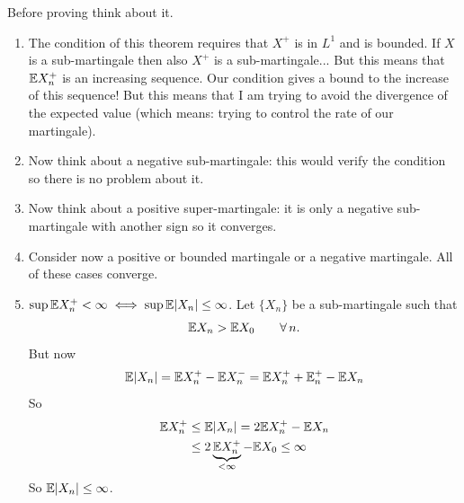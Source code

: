 \documentclass{report}
\begin{document}
Before proving think about it. \begin{enumerate}
\item	The condition of this theorem requires that $X^{+}$ is in $L^{1}$ and is bounded. If $X$ is a sub-martingale then also $X^{+}$ is a sub-martingale... But this means that $\mathbb{E} X^{+}_{n}$ is an increasing sequence. Our condition gives a bound to the increase of this sequence! But this means that I am trying to avoid the divergence of the expected value (which means: trying to control the rate of our martingale). 
\item Now think about a negative sub-martingale: this would verify the condition so there is no problem about it.
\item Now think about a positive super-martingale: it is only a negative sub-martingale with another sign so it converges.
\item Consider now a positive or bounded martingale or a negative martingale. All of these cases converge. 
\item $\sup\mathbb{E} X_{n}^{+}<\infty\iff\sup\mathbb{E}|X_{n}|\leq\infty$. Let $\{X_{n}\}$ be a sub-martingale such that
\begin{equation*}
	\mathbb{E} X_{n}>\mathbb{E} X_{0}\qquad\forall\, n.
\end{equation*}
But now \begin{equation*}
	\mathbb{E}|X_{n}|=\mathbb{E} X_{n}^{+}-\mathbb{E} X_{n}^{-}=\mathbb{E} X_{n}^{+}+\mathbb{E}_{n}^{+}-\mathbb{E} X_{n}
\end{equation*}
So
\begin{align*}
	\mathbb{E} X_{n}^{+}&\leq\mathbb{E}|X_{n}|=2\mathbb{E} X_{n}^{+}-\mathbb{E} X_{n}\\
	&\leq 2\underbrace{\mathbb{E} X_{n}^{+}}_{<\infty}-\mathbb{E} X_{0}\leq\infty
\end{align*}
So $\mathbb{E}|X_{n}|\leq\infty$.
\end{enumerate}
\end{document}
